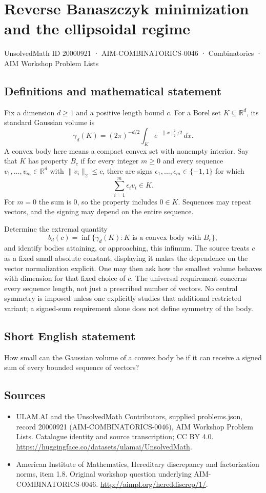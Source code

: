 \documentclass[11pt,a4paper]{article}
\begin{document}
\section*{Reverse Banaszczyk minimization and the ellipsoidal regime}\label{20000921}
{\small UnsolvedMath ID 20000921 · AIM-COMBINATORICS-0046 · Combinatorics · AIM Workshop Problem Lists}
\subsection{Definitions and mathematical statement}
Fix a dimension $d\geq1$ and a positive length bound $c$.
For a Borel set $K\subseteq\mathbb R^d$, its standard Gaussian volume is
\[
 \gamma_d(K)=(2\pi)^{-d/2}\int_K e^{-\|x\|_2^2/2}\,dx.
\]
A convex body here means a compact convex set with nonempty interior.
Say that $K$ has property $B_c$ if for every integer $m\geq0$ and every sequence $v_1,\ldots,v_m\in\mathbb R^d$ with $\|v_i\|_2\leq c$, there are signs $\epsilon_1,\ldots,\epsilon_m\in\{-1,1\}$ for which
\[
 \sum_{i=1}^m\epsilon_i v_i\in K.
\]
For $m=0$ the sum is $0$, so the property includes $0\in K$.
Sequences may repeat vectors, and the signing may depend on the entire sequence.

Determine the extremal quantity
\[
 b_d(c)=\inf\{\gamma_d(K):K\text{ is a convex body with }B_c\},
\]
and identify bodies attaining, or approaching, this infimum.
The source treats $c$ as a fixed small absolute constant; displaying it makes the dependence on the vector normalization explicit.
One may then ask how the smallest volume behaves with dimension for that fixed choice of $c$.
The universal requirement concerns every sequence length, not just a prescribed number of vectors.
No central symmetry is imposed unless one explicitly studies that additional restricted variant; a signed-sum requirement alone does not define symmetry of the body.
\subsection{Short English statement}
How small can the Gaussian volume of a convex body be if it can receive a signed sum of every bounded sequence of vectors?
\subsection{Sources}
\begin{itemize}
\item[S1] ULAM.AI and the UnsolvedMath Contributors, supplied problems.json, record 20000921 (AIM-COMBINATORICS-0046), AIM Workshop Problem Lists. Catalogue identity and source transcription; CC BY 4.0.
\url{https://huggingface.co/datasets/ulamai/UnsolvedMath}.
\item[S2] American Institute of Mathematics, Hereditary discrepancy and factorization norms, item 1.8. Original workshop question underlying AIM-COMBINATORICS-0046.
\url{http://aimpl.org/hereddiscrep/1/}.
\end{itemize}
\end{document}
